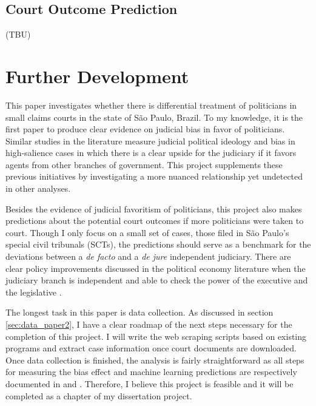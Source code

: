 \documentclass[11pt]{article}
\begin{document}
\subsection{Court Outcome Prediction} \label{subsec:methods2_paper2}

(TBU)

\section{Further Development} \label{sec:conclusion_paper2}

This paper investigates whether there is differential treatment of politicians in small claims courts in the state of São Paulo, Brazil. To my knowledge, it is the first paper to produce clear evidence on judicial bias in favor of politicians. Similar studies in the literature measure judicial political ideology and bias in high-salience cases in which there is a clear upside for the judiciary if it favors agents from other branches of government. This project supplements these previous initiatives by investigating a more nuanced relationship yet undetected in other analyses.

Besides the evidence of judicial favoritism of politicians, this project also makes predictions about the potential court outcomes if more politicians were taken to court. Though I only focus on a small set of cases, those filed in São Paulo's special civil tribunals (SCTs), the predictions should serve as a benchmark for the deviations between a \emph{de facto} and a \emph{de jure} independent judiciary. There are clear policy improvements discussed in the political economy literature when the judiciary branch is independent and able to check the power of the executive and the legislative \citep{BalandChapter69Governance2010}.

The longest task in this paper is data collection. As discussed in section \ref{sec:data_paper2}, I have a clear roadmap of the next steps necessary for the completion of this project. I will write the web scraping scripts based on existing programs and extract case information once court documents are downloaded. Once data collection is finished, the analysis is fairly straightforward as all steps for measuring the bias effect and machine learning predictions are respectively documented in \citet{AbramsJudgesVaryTheir2012} and \citet{AtheypredictionUsingbig2017,AtheyImpactMachineLearning2019}. Therefore, I believe this project is feasible and it will be completed as a chapter of my dissertation project.


\clearpage

\setlength\bibsep{0pt}


\end{document}
